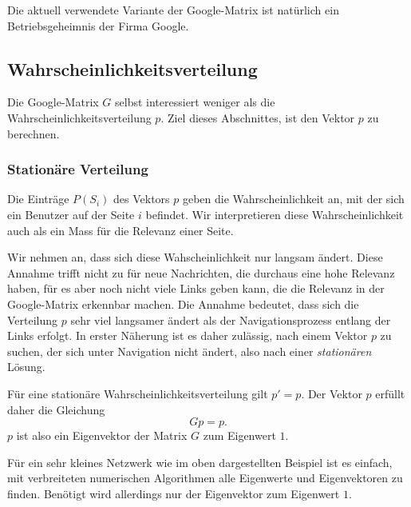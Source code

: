 Die aktuell verwendete Variante der Google-Matrix ist natürlich ein
Betriebsgeheimnis der Firma Google.

%
%
\subsection{Wahrscheinlichkeitsverteilung
\label{buch:subsection:wahrscheinlichkeitsverteilung}}
Die Google-Matrix $G$ selbst interessiert weniger als die
Wahrscheinlichkeitsverteilung $p$.
Ziel dieses Abschnittes, ist den Vektor $p$ zu berechnen.

\subsubsection{Stationäre Verteilung}
Die Einträge $P(S_i)$ des Vektors $p$ geben die Wahrscheinlichkeit an, mit
der sich ein Benutzer auf der Seite $i$ befindet.
Wir interpretieren diese Wahrscheinlichkeit auch als ein Mass für die
Relevanz einer Seite.

Wir nehmen an, dass sich diese Wahscheinlichkeit nur langsam ändert.
Diese Annahme trifft nicht zu für neue Nachrichten, die durchaus eine
hohe Relevanz haben, für es aber noch nicht viele Links geben kann,
die die Relevanz in der Google-Matrix erkennbar machen.
Die Annahme bedeutet, dass sich die Verteilung $p$ sehr viel langsamer 
ändert als der Navigationsprozess entlang der Links erfolgt.
In erster Näherung ist es daher zulässig, nach einem Vektor $p$ zu
suchen, der sich unter Navigation nicht ändert, also nach einer
{\em stationären} Lösung.
%

Für eine stationäre Wahrscheinlichkeitsverteilung gilt $p'=p$.
Der Vektor $p$ erfüllt daher die Gleichung
\begin{equation}
Gp = p.
\label{buch:google:ewgleichung}
\end{equation}
$p$ ist also ein Eigenvektor der Matrix $G$ zum Eigenwert $1$.

Für ein sehr kleines Netzwerk wie im oben dargestellten Beispiel ist es
einfach, mit verbreiteten numerischen Algorithmen alle Eigenwerte und
Eigenvektoren zu finden.
Benötigt wird allerdings nur der Eigenvektor zum Eigenwert $1$.

